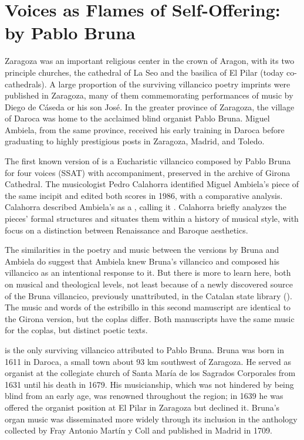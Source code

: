 \section{Voices as Flames of Self-Offering: 
 by Pablo Bruna}

Zaragoza was an important religious center in the crown of Aragon, with its two
principle churches, the cathedral of La Seo and the basilica of El Pilar (today
co-cathedrals).  
A large proportion of the surviving villancico poetry imprints were published
in Zaragoza, many of them commemorating performances of music by Diego de
Cáseda or his son José.
In the greater province of Zaragoza, the village of Daroca was home to the
acclaimed blind organist Pablo Bruna.  
Miguel Ambiela, from the same province, received his early training in Daroca
before graduating to highly prestigious posts in Zaragoza, Madrid, and Toledo.

The first known version of  is a Eucharistic
villancico composed by Pablo Bruna for four voices (SSAT) with accompaniment,
preserved in the archive of Girona Cathedral.%
    \citXXX[signature]
The musicologist Pedro Calahorra identified Miguel Ambiela's piece of the same
incipit and edited both scores in 1986, with a comparative analysis.
Calahorra described Ambiela's  as a , calling it .%
    \Autocite[9]{Calahorra:Suban}
Calahorra briefly analyzes the pieces' formal structures and situates them
within a history of musical style, with focus on a distinction between
Renaissance and Baroque aesthetics.

The similarities in the poetry and music between the versions by Bruna and
Ambiela do suggest that Ambiela knew Bruna's villancico and composed his
villancico as an intentional response to it.
But there is more to learn here, both on musical and theological levels, not
least because of a newly discovered source of the Bruna villancico, previously
unattributed, in the Catalan state library ().
The music and words of the estribillo in this second manuscript are identical
to the Girona version, but the coplas differ.  
Both manuscripts have the same music for the coplas, but distinct poetic texts.

 is the only surviving villancico attributed to Pablo
Bruna.
Bruna was born in 1611 in Daroca, a small town about 93 km southwest of
Zaragoza.
He served as organist at the collegiate church of Santa María de los Sagrados
Corporales from 1631 until his death in 1679.%
	\Autocite[104]{Calahorra:Aragon}
His musicianship, which was not hindered by being blind from an early age, was
renowned throughout the region; in 1639 he was offered the organist position at
El Pilar in Zaragoza but declined it.%
    \Autocite[123--125]{Calahorra:Aragon}
Bruna's organ music was disseminated more widely through its inclusion in the
anthology  collected by Fray
Antonio Martín y Coll and published in Madrid in 1709.

